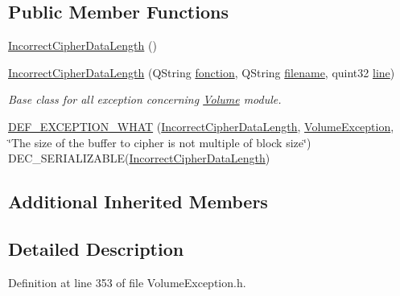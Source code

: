 \subsection*{Public Member Functions}
\begin{DoxyCompactItemize}
\item 
\hyperlink{class_gost_crypt_1_1_volume_1_1_incorrect_cipher_data_length_a908300c4aa59d6ab45665982f635544a}{Incorrect\+Cipher\+Data\+Length} ()
\item 
\hyperlink{class_gost_crypt_1_1_volume_1_1_incorrect_cipher_data_length_a2bd846062e119978430334573011ca08}{Incorrect\+Cipher\+Data\+Length} (Q\+String \hyperlink{class_gost_crypt_1_1_gost_crypt_exception_a29b8c93d5efbb1ff369107385725a939}{fonction}, Q\+String \hyperlink{class_gost_crypt_1_1_gost_crypt_exception_a749a12375f4ba9d502623b99d8252f38}{filename}, quint32 \hyperlink{class_gost_crypt_1_1_gost_crypt_exception_abf506d911f12a4e969eea500f90bd32c}{line})
\begin{DoxyCompactList}\small\item\em Base class for all exception concerning \hyperlink{class_gost_crypt_1_1_volume_1_1_volume}{Volume} module. \end{DoxyCompactList}\item 
\hyperlink{class_gost_crypt_1_1_volume_1_1_incorrect_cipher_data_length_a47407a8d595a4abe9d580410e07c52dd}{D\+E\+F\+\_\+\+E\+X\+C\+E\+P\+T\+I\+O\+N\+\_\+\+W\+H\+AT} (\hyperlink{class_gost_crypt_1_1_volume_1_1_incorrect_cipher_data_length}{Incorrect\+Cipher\+Data\+Length}, \hyperlink{class_gost_crypt_1_1_volume_1_1_volume_exception}{Volume\+Exception}, \char`\"{}The size of the buffer to cipher is not multiple of block size\char`\"{}) D\+E\+C\+\_\+\+S\+E\+R\+I\+A\+L\+I\+Z\+A\+B\+LE(\hyperlink{class_gost_crypt_1_1_volume_1_1_incorrect_cipher_data_length}{Incorrect\+Cipher\+Data\+Length})
\end{DoxyCompactItemize}
\subsection*{Additional Inherited Members}


\subsection{Detailed Description}


Definition at line 353 of file Volume\+Exception.\+h.



